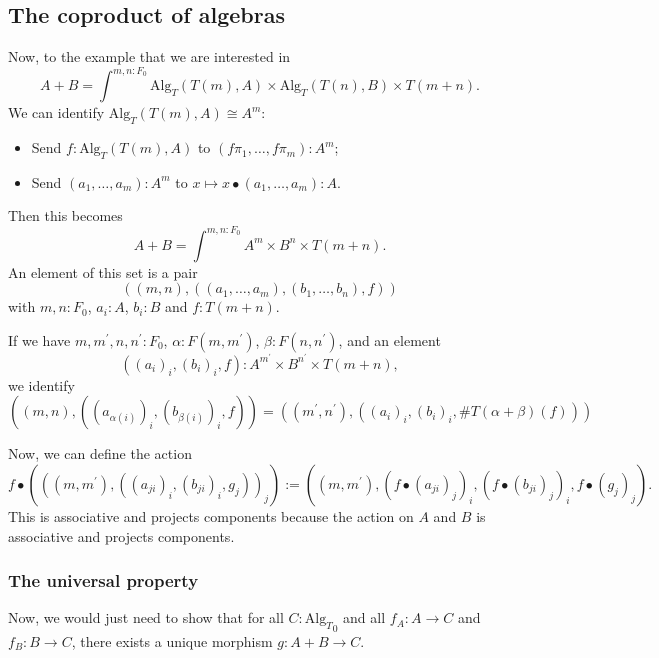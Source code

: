 \documentclass{amsbook}
\newcommand{\Ob}[1]{{#1}_0}
\newcommand{\Hom}[3]{{#1}\left(#2,#3\right)}
\theoremstyle{definition}
\begin{document}
  \subsection{The coproduct of algebras}
  Now, to the example that we are interested in
  \[ A + B = \int^{m,n : \Ob F} \mathrm{Alg}_T(T(m), A) \times \mathrm{Alg}_T(T(n), B) \times T(m + n). \]
  We can identify $ \mathrm{Alg}_T(T(m), A) \cong A^m $:
  \begin{itemize}
    \item Send $ f : \mathrm{Alg}_T(T(m), A) $ to $ (f \pi_1, \dots, f \pi_m) : A^m $;
    \item Send $ (a_1, \dots, a_m) : A^m $ to $ x \mapsto x \bullet (a_1, \dots, a_m) : A $.
  \end{itemize}
  Then this becomes
  \[ A + B = \int^{m,n : \Ob F} A^m \times B^n \times T(m + n). \]
  An element of this set is a pair
  \[ ((m, n), ((a_1, \dots, a_m), (b_1, \dots, b_n), f)) \]
  with $ m, n : \Ob F $, $ a_i : A $, $ b_i : B $ and $ f : T(m + n) $.

  If we have $ m, m^\prime, n, n^\prime : \Ob F $, $ \alpha : \Hom{F}{m}{m^\prime} $, $ \beta : \Hom{F}{n}{n^\prime} $, and an element
  \[ ((a_i)_i, (b_i)_i, f) : A^{m^\prime} \times B^{n^\prime} \times T(m + n), \]
  we identify
  \[ ((m, n), ((a_{\alpha(i)})_i, (b_{\beta(i)})_i, f)) = ((m^\prime, n^\prime), ((a_i)_i, (b_i)_i, \#T(\alpha + \beta)(f))) \]

  Now, we can define the action
  \[ f \bullet (((m, m^\prime), ((a_{ji})_i, (b_{ji})_i, g_j))_j) := ((m, m^\prime), (f \bullet (a_{ji})_j)_i, (f \bullet (b_{ji})_j)_i, f \bullet (g_j)_j). \]
  This is associative and projects components because the action on $ A $ and $ B $ is associative and projects components.

  \subsubsection{The universal property}
  Now, we would just need to show that for all $ C : \Ob{\mathrm{Alg}_T} $ and all $ f_A : A \to C $ and $ f_B : B \to C $, there exists a unique morphism $ g : A + B \to C $.
\end{document}
